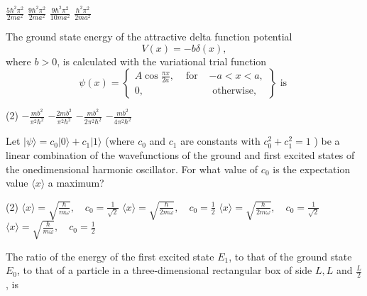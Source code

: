 \begin{enumerate}
\begin{tasks}
	\task[\textbf{A.}] $\frac{5 \hbar^{2} \pi^{2}}{2 m a^{2}}$
	\task[\textbf{B.}]$\frac{9 \hbar^{2} \pi^{2}}{2 m a^{2}}$
	\task[\textbf{C.}]$\frac{9 \hbar^{2} \pi^{2}}{10 m a^{2}}$
	\task[\textbf{D.}]$\frac{\hbar^{2} \pi^{2}}{2 m a^{2}}$
\end{tasks}
\begin{minipage}{\textwidth}
	\item The ground state energy of the attractive delta function potential
	$$
	V(x)=-b \delta(x),
	$$
	where $b>0$, is calculated with the variational trial function
	$$
	\psi(x)=\left\{\begin{array}{ccc}
	A \cos \frac{\pi x}{2 a}, & \text { for } & -a<x<a, \\
	0, & & \text { otherwise, }
	\end{array}\right\} \text { is }
	$$
\end{minipage}
\begin{tasks}(2)
	\task[\textbf{A.}] $-\frac{m b^{2}}{\pi^{2} \hbar^{2}}$
	\task[\textbf{B.}]$-\frac{2 m b^{2}}{\pi^{2} \hbar^{2}}$
	\task[\textbf{C.}]$-\frac{m b^{2}}{2 \pi^{2} \hbar^{2}}$
	\task[\textbf{D.}]$-\frac{m b^{2}}{4 \pi^{2} \hbar^{2}}$
\end{tasks}
\begin{minipage}{\textwidth}
	\item Let $|\psi\rangle=c_{0}|0\rangle+c_{1}|1\rangle$ (where $c_{0}$ and $c_{1}$ are constants with $c_{0}^{2}+c_{1}^{2}=1$ ) be a linear combination of the wavefunctions of the ground and first excited states of the onedimensional harmonic oscillator. For what value of $c_{0}$ is the expectation value $\langle x\rangle$ a maximum?
\end{minipage}
\begin{tasks}(2)
	\task[\textbf{A.}] $\langle x\rangle=\sqrt{\frac{\hbar}{m \omega}}, \quad c_{0}=\frac{1}{\sqrt{2}}$
	\task[\textbf{B.}]$\langle x\rangle=\sqrt{\frac{\hbar}{2 m \omega}}, \quad c_{0}=\frac{1}{2}$
	\task[\textbf{C.}]$\langle x\rangle=\sqrt{\frac{\hbar}{2 m \omega}}, \quad c_{0}=\frac{1}{\sqrt{2}}$
	\task[\textbf{D.}]$\langle x\rangle=\sqrt{\frac{\hbar}{m \omega}}, \quad c_{0}=\frac{1}{2}$
\end{tasks}
\begin{minipage}{\textwidth}
	\item The ratio of the energy of the first excited state $E_{1}$, to that of the ground state $E_{0}$, to that of a particle in a three-dimensional rectangular box of side $L, L$ and $\frac{L}{2}$, is

\end{minipage}
\end{enumerate}
